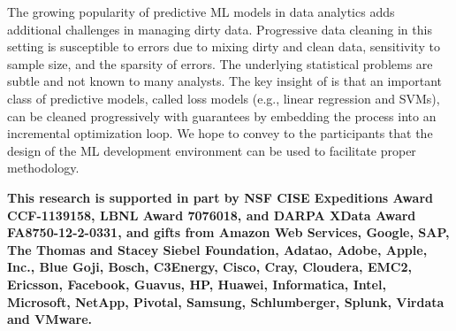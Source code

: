 The growing popularity of predictive ML models in data analytics adds additional challenges in managing dirty data.
Progressive data cleaning in this setting is susceptible to errors due to mixing dirty and clean data, sensitivity to sample size, and the sparsity of errors.
The underlying statistical problems are subtle and not known to many analysts.
The key insight of \sys is that an important class of predictive models, called loss models (e.g., linear regression and SVMs), can be cleaned progressively with guarantees by embedding the process into an incremental optimization loop.
We hope to convey to the participants that the design of the ML development environment can be used to facilitate proper methodology.

\vspace{1em}

\textbf{\small This research is supported in part by NSF CISE Expeditions Award CCF-1139158, LBNL Award 7076018, and DARPA XData Award FA8750-12-2-0331, and gifts from Amazon Web Services, Google, SAP, The Thomas and Stacey Siebel Foundation, Adatao, Adobe, Apple, Inc., Blue Goji, Bosch, C3Energy, Cisco, Cray, Cloudera, EMC2, Ericsson, Facebook, Guavus, HP, Huawei, Informatica, Intel, Microsoft, NetApp, Pivotal, Samsung, Schlumberger, Splunk, Virdata and VMware.}
